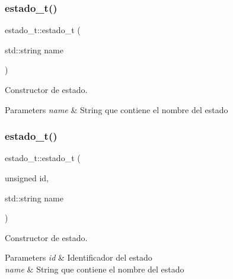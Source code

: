 \subsubsection{\texorpdfstring{estado\+\_\+t()}{estado\_t()}\hspace{0.1cm}{\footnotesize\ttfamily [1/4]}}
{\footnotesize\ttfamily estado\+\_\+t\+::estado\+\_\+t (\begin{DoxyParamCaption}\item[{std\+::string}]{name }\end{DoxyParamCaption})\hspace{0.3cm}{\ttfamily [inline]}}



Constructor de estado. 


\begin{DoxyParams}{Parameters}
{\em name} & String que contiene el nombre del estado \\
\hline
\end{DoxyParams}
\mbox{\label{classestado__t_aafc259bc6968f50e891da9ce4e3cf41d}} 
\subsubsection{\texorpdfstring{estado\+\_\+t()}{estado\_t()}\hspace{0.1cm}{\footnotesize\ttfamily [2/4]}}
{\footnotesize\ttfamily estado\+\_\+t\+::estado\+\_\+t (\begin{DoxyParamCaption}\item[{unsigned}]{id,  }\item[{std\+::string}]{name }\end{DoxyParamCaption})}



Constructor de estado. 


\begin{DoxyParams}{Parameters}
{\em id} & Identificador del estado \\
\hline
{\em name} & String que contiene el nombre del estado \\
\hline
\end{DoxyParams}
\mbox{\label{classestado__t_aae570f94727aefd44cc17b4f06575ed7}} 
